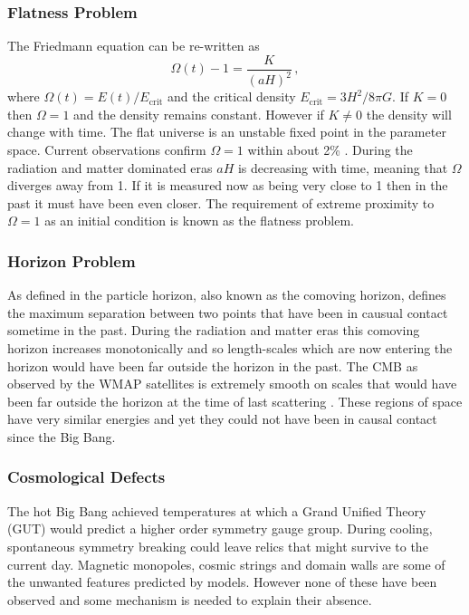 \subsubsection{Flatness Problem} 
\label{sec:flatprob}
The Friedmann equation
 can be re-written as
% 
\begin{equation}
\label{eq:omegadefn-intro}
\Omega(t) - 1 = \frac{K}{(aH)^2} \,,
\end{equation}
% 
where $\Omega(t)=E(t)/E_\mathrm{crit}$ and the critical density
$E_\mathrm{crit}= 3H^2/8\pi G$. 
If $K=0$ then $\Omega=1$ and the density remains constant. However if
$K\neq0$ the density will change with time. The flat universe is an
unstable fixed point in the parameter space.
Current observations confirm $\Omega=1$ within about 2\% \cite{Komatsu:2008hk}.
During the radiation and matter dominated eras $aH$ is decreasing with time,
meaning that $\Omega$ diverges away from 1. If it is measured now as being very
close to 1 then in the past it must have been even closer. The requirement of
extreme proximity to $\Omega=1$ as an initial condition is known as the
flatness problem. 


\subsubsection{Horizon Problem} \label{sec:horizprob}
As defined in  the particle horizon, also known
as the comoving horizon, defines the maximum separation between two points that
have been in causual contact sometime in the past. During the radiation and
matter eras this comoving horizon increases monotonically and so length-scales
which are now entering the horizon would have been far outside the horizon in
the past. 
The CMB as observed by the WMAP satellites is extremely smooth on scales that
would have been far outside the horizon at the time of last scattering
\cite{Komatsu:2008hk}. These regions of space have very similar energies and
yet they could not have been in causal contact since the Big Bang. 


\subsubsection{Cosmological Defects} \label{sec:cosdefects}
The hot Big Bang achieved temperatures at which a Grand Unified Theory
(GUT) would predict a higher order symmetry gauge group. During cooling,
spontaneous symmetry breaking could leave relics that might survive to
the current day. Magnetic monopoles, cosmic strings and domain walls are some of
the unwanted features predicted by models. However none of these have been
observed and some mechanism is needed to explain their absence.




